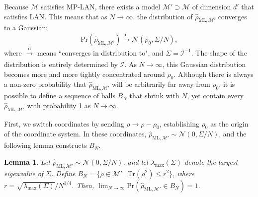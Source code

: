 \documentclass[aps,pra, twocolumn]{revtex4-1}
\newcommand{\M}{\mathcal{M}}
\newcommand{\rhohat}{\hat{\rho}}
\newcommand{\rhoML}[1]{\rhohat_{\scriptscriptstyle{\mathrm{ML},#1}}}
\newtheorem{lem}{Lemma}
\begin{document}
Because $\M$ satisfies MP-LAN, there exists a model $\M' \supset \M$ of dimension $d'$ that satisfies LAN. This means that as $N \rightarrow \infty$, the distribution of $\rhoML{\M'}$ converges to a Gaussian:
\[\mathrm{Pr}(\rhoML{\M'})\xrightarrow[]{\text{d}} \mathcal{N}(\rho_{0}, \Sigma/N),\]
where $\xrightarrow[]{\text{d}}$ means ``converges in distribution to", and $\Sigma = \mathcal{I}^{-1}$.
The shape of the distribution is entirely determined by $\mathcal{I}$. As $N \rightarrow \infty$, this Gaussian distribution becomes more and more tightly concentrated around $\rho_{0}$. Although there is always a non-zero probability that $\rhoML{\M'}$ will be arbitrarily far away from $\rho_{0}$, it is possible to define a sequence of balls $B_{N}$ that shrink with $N$, yet contain every $\rhoML{\M'}$ with probability 1 as $N \rightarrow \infty$.

First, we switch coordinates by sending $\rho \rightarrow \rho - \rho_{0}$, establishing $\rho_{0}$ as the origin of the coordinate system. In these coordinates, $\rhoML{\M'} \sim \mathcal{N}(0, \Sigma/N)$, and the following lemma constructs $B_{N}$.

\begin{lem}
\label{eq:lem}
Let $\rhoML{\M'} \sim \mathcal{N}(0, \Sigma/N)$, and let $\lambda_{\max}(\Sigma)$ denote the largest eigenvalue of $\Sigma$. Define $B_{N} = \{\rho \in \M' ~|~\mathrm{Tr}(\rho^{2}) \leq r^{2}\}$, where $r = \sqrt{\lambda_{\max}(\Sigma)}/N^{1/4}$. Then, $\lim_{N \rightarrow \infty} \mathrm{Pr}(\rhoML{\M'} \in B_{N}) =1$.
\end{lem}
\end{document}
